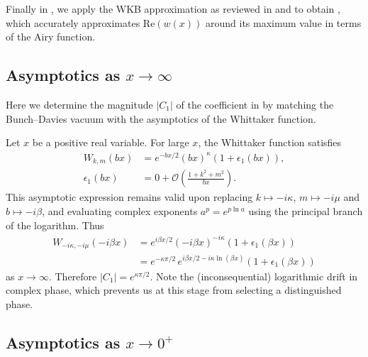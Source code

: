Finally in , we apply the WKB approximation as reviewed in  and  to obtain , which accurately approximates $\textrm{Re}(w(x))$ around its maximum value in terms of the Airy function.

\subsection{\label{subsec:asymp-normalization}Asymptotics as \texorpdfstring{$x\to\infty$}{x\to\infty}}

Here we determine the magnitude $\left|C_{1}\right|$ of the coefficient in  by matching the Bunch--Davies vacuum with the asymptotics of the Whittaker function. 

Let $x$ be a positive real variable. For large $x$, the Whittaker function satisfies 
\begin{align*}
W_{k,m}(bx) & =e^{-bx/2}(bx)^{\kappa}\left(1+\epsilon_{1}(bx)\right),\\
\epsilon_{1}(bx) & =0+\mathcal{O}\left(\frac{1+k^{2}+m^{2}}{bx}\right).
\end{align*}
 This asymptotic expression remains valid upon replacing $k\mapsto-i\kappa$, $m\mapsto-i\mu$ and $b\mapsto-i\beta$, and evaluating complex exponents $a^{p}=e^{p\ln a}$ using the principal branch of the logarithm. Thus 
\begin{align}
W_{-i\kappa,-i\mu}(-i\beta x) & =e^{i\beta x/2}(-i\beta x)^{-i\kappa}\left(1+\epsilon_{1}(\beta x)\right)\nonumber \\
 & =e^{-\kappa\pi/2}\,e^{i\beta x/2-i\kappa\ln(\beta x)}\left(1+\epsilon_{1}(\beta x)\right)\label{eq:log-drift}
\end{align}
 as $x\to\infty$. Therefore $\left|C_{1}\right|=e^{\kappa\pi/2}$. Note the (inconsequential) logarithmic drift in complex phase, which prevents us at this stage from selecting a distinguished phase.

\subsection{\label{subsec:asymp-x-0}Asymptotics as \texorpdfstring{$x\to0^+$}{x+}}

